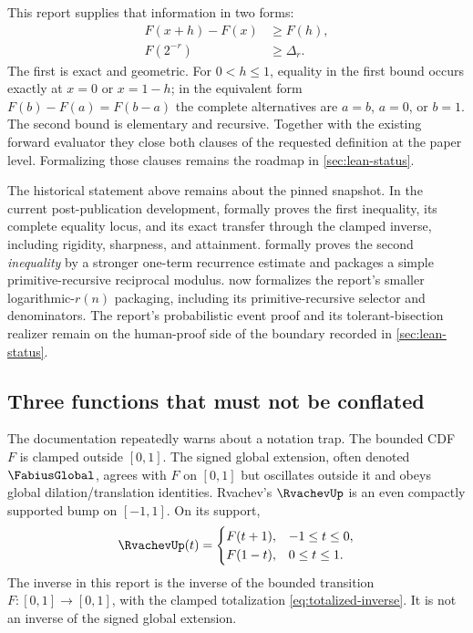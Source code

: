 \documentclass[11pt,oneside]{article}
\theoremstyle{definition}
\theoremstyle{remark}
\numberwithin{equation}{section}
\begin{document}
This report supplies that information in two forms:
\begin{align}
 F(x+h)-F(x)&\ge F(h),\label{eq:gap-interval-preview}\\
 F(2^{-r})&\ge\Delta_r.\label{eq:gap-delta-preview}
\end{align}
The first is exact and geometric.  For $0<h\le1$, equality in the first bound
occurs exactly at $x=0$ or $x=1-h$; in the equivalent form
$F(b)-F(a)=F(b-a)$ the complete alternatives are $a=b$, $a=0$, or $b=1$.
The second bound is elementary and recursive.
Together with the existing forward evaluator they close both clauses of the
requested definition at the paper level.  Formalizing those clauses remains
the roadmap in \cref{sec:lean-status}.

The historical statement above remains about the pinned snapshot.  In the
current post-publication development,  formally
proves the first inequality, its complete equality locus, and its exact
transfer through the clamped inverse, including rigidity, sharpness, and
attainment.
 formally proves the second
\emph{inequality} by a stronger one-term recurrence estimate and packages a
simple primitive-recursive reciprocal modulus.
 now formalizes the report's smaller
logarithmic-$r(n)$ packaging, including its primitive-recursive selector and
denominators.  The report's probabilistic event proof and its
tolerant-bisection realizer remain on the human-proof side of the boundary
recorded in \cref{sec:lean-status}.

\subsection{Three functions that must not be conflated}

The documentation repeatedly warns about a notation trap.  The bounded CDF
$F$ is clamped outside $[0,1]$.  The signed global extension, often denoted
$\FabiusGlobal$, agrees with $F$ on $[0,1]$ but oscillates outside it and obeys
global dilation/translation identities.  Rvachev's $\RvachevUp$ is an even compactly
supported bump on $[-1,1]$.  On its support,
\begin{equation}\label{eq:up-F-relation}
 \RvachevUp(t)=
 \begin{cases}
   F(t+1),&-1\le t\le0,\\
   F(1-t),&0\le t\le1.
 \end{cases}
\end{equation}
The inverse in this report is the inverse of the bounded transition
$F:[0,1]\to[0,1]$, with the clamped totalization \eqref{eq:totalized-inverse}.
It is not an inverse of the signed global extension.
\end{document}
